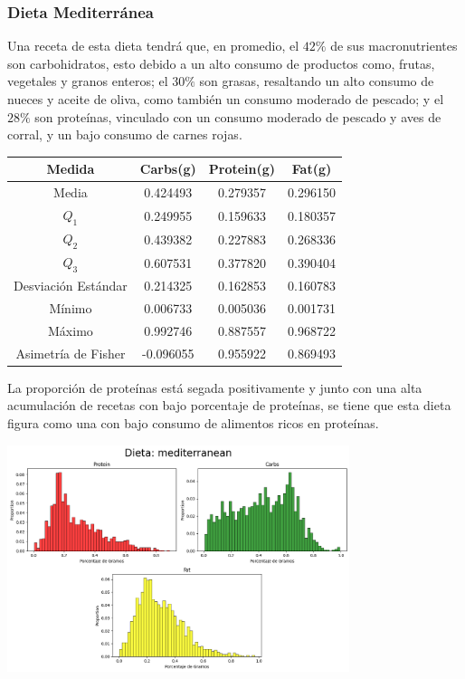 \documentclass[12pt,a4paper]{article}
\begin{document}
    \subsubsection{Dieta Mediterránea}
        Una receta de esta dieta tendrá que, en promedio, el $42\%$ de sus 
        macronutrientes son carbohidratos, esto debido a un alto consumo de 
        productos como, frutas, vegetales y granos enteros; el $30\%$ son 
        grasas, resaltando un alto consumo de nueces y aceite de oliva, como 
        también un consumo moderado de pescado; y el $28\%$ son proteínas, 
        vinculado con un consumo moderado de pescado y aves de corral, y un 
        bajo consumo de carnes rojas. 
        \begin{center}
            \begin{tabular}{|c|ccc|}
                \hline
                Medida & Carbs(g) & Protein(g) & Fat(g) \\
                \hline
                Media               & 0.424493 & 0.279357 & 0.296150  \\
                $Q_1$               & 0.249955 & 0.159633 & 0.180357  \\
                $Q_2$               & 0.439382 & 0.227883 & 0.268336  \\
                $Q_3$               & 0.607531 & 0.377820 & 0.390404  \\
                Desviación Estándar & 0.214325 & 0.162853 & 0.160783  \\
                Mínimo              & 0.006733 & 0.005036 & 0.001731  \\
                Máximo              & 0.992746 & 0.887557 & 0.968722  \\
                Asimetría de Fisher & -0.096055 & 0.955922 & 0.869493 \\
                \hline
            \end{tabular}
        \end{center}
        La proporción de proteínas está segada positivamente y junto con una 
        alta acumulación de recetas con bajo porcentaje de proteínas, se tiene que 
        esta dieta figura como una con bajo consumo de alimentos ricos en proteínas. 
        \begin{center}
            \includegraphics[width=0.75\textwidth]{Resources/2_03_plot_03.png}
        \end{center}
\end{document}

